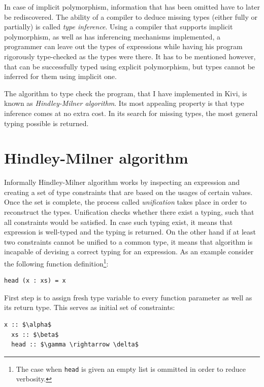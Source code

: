 \documentclass[12pt,a4paper]{report}
\begin{document}
In case of implicit polymorphism, information that has been omitted have to
later be rediscovered. The ability of a compiler to deduce missing types
(either fully or partially) is called \textit{type inference}. Using a compiler
that supports implicit polymorphism, as well as has inferencing mechanisms
implemented, a programmer can leave out the types of expressions while having
his program rigorously type-checked as the types were there. It has to be
mentioned however, that can be successfully typed using explicit polymorphism,
but types cannot be inferred for them using implicit one.

The algorithm to type check the program, that I have implemented in Kivi, is
known as \textit{Hindley-Milner algorithm}. Its most appealing property is that
type inference comes at no extra cost. In its search for missing types, the
most general typing possible is returned.

\section{Hindley-Milner algorithm}
Informally Hindley-Milner algorithm works by inspecting an expression and
creating a set of type constraints that are based on the usages of certain
values. Once the set is complete, the process called \textit{unification} takes
place in order to reconstruct the types. Unification checks whether there exist
a typing, such that all constraints would be satisfied. In case such typing
exist, it means that expression is well-typed and the typing is returned.
On the other hand if at least two constraints cannot be unified to a common
type, it means that algorithm is incapable of devising a correct typing for an
expression. As an example consider the following function
definition\footnote{The case when \texttt{head} is given an empty list is
ommitted in order to reduce verbosity.}:

\vspace*{0.2in}
\begin{lstlisting}[style=haskell]
head (x : xs) = x
\end{lstlisting}

First step is to assign fresh type variable to every function parameter as
well as its return type. This serves as initial set of constraints:

\vspace*{0.2in}
\begin{lstlisting}[mathescape=true,style=haskell]
  x :: $\alpha$
  xs :: $\beta$
  head :: $\gamma \rightarrow \delta$
\end{lstlisting}
\end{document}
